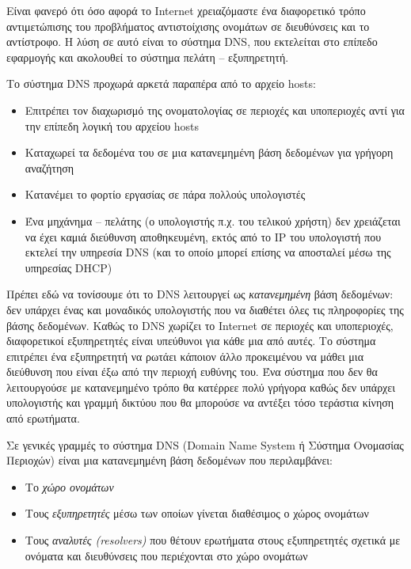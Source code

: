 Είναι φανερό ότι όσο αφορά το Internet χρειαζόμαστε ένα διαφορετικό τρόπο αντιμετώπισης του προβλήματος αντιστοίχισης ονομάτων σε διευθύνσεις και το αντίστροφο. Η λύση σε αυτό είναι το σύστημα DNS, που εκτελείται στο επίπεδο εφαρμογής και ακολουθεί το σύστημα πελάτη -- εξυπηρετητή.

Το σύστημα DNS προχωρά αρκετά παραπέρα από το αρχείο hosts:

\begin{itemize}
\item Επιτρέπει τον διαχωρισμό της ονοματολογίας σε περιοχές και υποπεριοχές αντί για την επίπεδη λογική του αρχείου hosts
\item Καταχωρεί τα δεδομένα του σε μια κατανεμημένη βάση δεδομένων για γρήγορη αναζήτηση
\item Κατανέμει το φορτίο εργασίας σε πάρα πολλούς υπολογιστές
\item Ένα μηχάνημα -- πελάτης (ο υπολογιστής π.χ. του τελικού χρήστη) δεν χρειάζεται να έχει καμιά διεύθυνση αποθηκευμένη, εκτός από το IP του υπολογιστή που εκτελεί την υπηρεσία DNS (και το οποίο μπορεί επίσης να αποσταλεί μέσω της υπηρεσίας DHCP)
\end{itemize}

Πρέπει εδώ να τονίσουμε ότι το DNS λειτουργεί ως \emph{κατανεμημένη} βάση δεδομένων: δεν υπάρχει ένας και μοναδικός υπολογιστής που να διαθέτει όλες τις πληροφορίες της βάσης δεδομένων. Καθώς το DNS χωρίζει το Internet σε περιοχές και υποπεριοχές, διαφορετικοί εξυπηρετητές είναι υπεύθυνοι για κάθε μια από αυτές. Το σύστημα επιτρέπει ένα εξυπηρετητή να ρωτάει κάποιον άλλο προκειμένου να μάθει μια διεύθυνση που είναι έξω από την περιοχή ευθύνης του. Ένα σύστημα που δεν θα λειτουργούσε με κατανεμημένο τρόπο θα κατέρρεε πολύ γρήγορα καθώς δεν υπάρχει υπολογιστής και γραμμή δικτύου που θα μπορούσε να αντέξει τόσο τεράστια κίνηση από ερωτήματα.

Σε γενικές γραμμές το σύστημα DNS (Domain Name System ή Σύστημα Ονομασίας Περιοχών) είναι μια κατανεμημένη βάση δεδομένων που περιλαμβάνει:

\begin{itemize}
\item Το \emph{χώρο ονομάτων}
\item Τους \emph{εξυπηρετητές} μέσω των οποίων γίνεται διαθέσιμος ο χώρος ονομάτων
\item Τους \emph{αναλυτές (resolvers)} που θέτουν ερωτήματα στους εξυπηρετητές σχετικά με ονόματα και διευθύνσεις που περιέχονται στο χώρο ονομάτων
\end{itemize}

